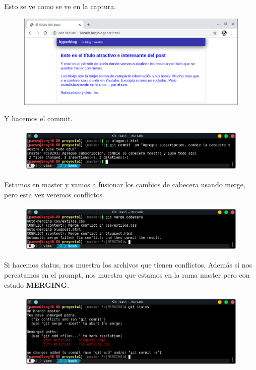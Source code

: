 \documentclass{article}
\begin{document}
Esto se ve como se ve en la captura.

\begin{figure}[h!]
  \centering
  \includegraphics[scale=0.75]{./Pictures/176_master_web.png}
\end{figure}

\newpage

Y hacemos el commit.

\begin{figure}[h!]
  \centering
  \includegraphics[scale=0.75]{./Pictures/175_commit_master.png}
\end{figure}

Estamos en master y vamos a fusionar los cambios de cabecera usando merge, pero
esta vez veremos conflictos.

\begin{figure}[h!]
  \centering
  \includegraphics[scale=0.75]{./Pictures/177_merge_conflict.png}
\end{figure}

Si hacemos status, nos muestra los archivos que tienen conflictos. Además si
nos percatamos en el prompt, nos muestra que estamos en la rama master pero con
estado \textbf{MERGING}.

\begin{figure}[h!]
  \centering
  \includegraphics[scale=0.75]{./Pictures/178_conflict_status.png}
\end{figure}
\end{document}
